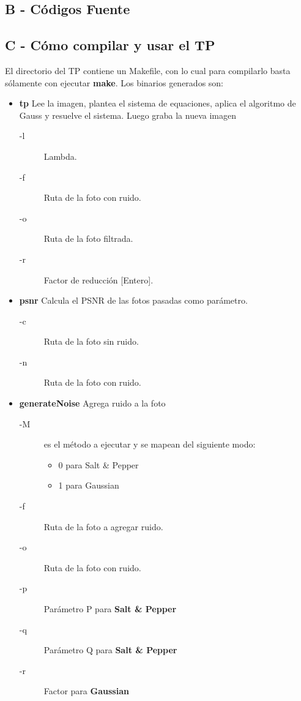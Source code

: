 \documentclass[a4paper]{article}
\begin{document}
\newpage

\subsection{B - Códigos Fuente}


\subsection{C - Cómo compilar y usar el TP}
El directorio del TP contiene un Makefile, con lo cual para compilarlo basta sólamente con ejecutar \textbf{make}. Los binarios generados son: 

\begin{itemize}
  \item \textbf{tp} Lee la imagen, plantea el sistema de equaciones, aplica el algoritmo de Gauss y resuelve el sistema. Luego graba la nueva imagen
  \begin{description}
	\item[-l] Lambda.
	\item[-f] Ruta de la foto con ruido.
	\item[-o] Ruta de la foto filtrada.
	\item[-r] Factor de reducción [Entero].
  \end{description}


  \item \textbf{psnr} Calcula el PSNR de las fotos pasadas como parámetro.
  \begin{description}
	\item[-c] Ruta de la foto sin ruido.
	\item[-n] Ruta de la foto con ruido.
  \end{description}

  \item \textbf{generateNoise} Agrega ruido a la foto
  \begin{description}
	\item[-M] es el método a ejecutar y se mapean del siguiente modo:
	\begin{itemize}
	   \item 0 para Salt \& Pepper
	   \item 1 para Gaussian
         \end{itemize}

	\item[-f] Ruta de la foto a agregar ruido.
	\item[-o] Ruta de la foto con ruido.
	\item[-p] Parámetro P para \textbf{Salt \& Pepper}
	\item[-q] Parámetro Q para \textbf{Salt \& Pepper}
	\item[-r] Factor para \textbf{Gaussian}
  \end{description}

\end{itemize}
\end{document}
